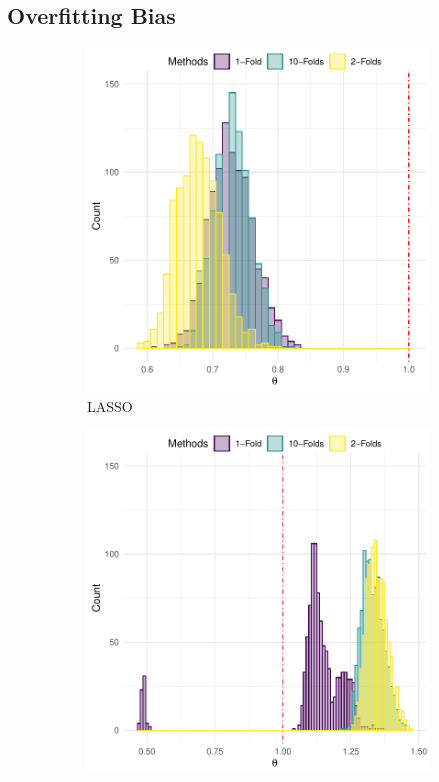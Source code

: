 \documentclass[en,mtpro2]{elegantpaper}
\begin{document}
\subsection{Overfitting Bias}

\begin{figure}[htpb]
    \centering
    \begin{subfigure}{.45\textwidth}
        \centering
        \includegraphics[width=\linewidth]{figures/intution-full-sample-vs-split-sample-lasso.pdf}
        \caption{LASSO}
    \end{subfigure}
    \begin{subfigure}{.45\textwidth}
        \centering
        \includegraphics[width=\linewidth]{figures/intution-full-sample-vs-split-sample-rf.pdf}

\end{subfigure}
\end{figure}
\end{document}
